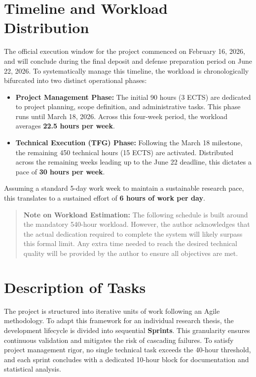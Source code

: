 \section{Timeline and Workload Distribution}
\label{sec:timeline-and-workload}

The official execution window for the project commenced on February 16, 2026, and will conclude during the final deposit and defense preparation period on June 22, 2026. To systematically manage this timeline, the workload is chronologically bifurcated into two distinct operational phases:

\begin{itemize}
    \item \textbf{Project Management Phase:} The initial 90 hours (3 ECTS) are dedicated to project planning, scope definition, and administrative tasks. This phase runs until March 18, 2026. Across this four-week period, the workload averages \textbf{22.5 hours per week}.
    \item \textbf{Technical Execution (TFG) Phase:} Following the March 18 milestone, the remaining 450 technical hours (15 ECTS) are activated. Distributed across the remaining weeks leading up to the June 22 deadline, this dictates a pace of \textbf{30 hours per week}.
\end{itemize}

Assuming a standard 5-day work week to maintain a sustainable research pace, this translates to a sustained effort of \textbf{6 hours of work per day}.

\begin{quote}
    \textbf{Note on Workload Estimation:} The following schedule is built around the mandatory 540-hour workload. However, the author acknowledges that the actual dedication required to complete the system will likely surpass this formal limit. Any extra time needed to reach the desired technical quality will be provided by the author to ensure all objectives are met.
\end{quote}

\section{Description of Tasks}
\label{sec:description-of-tasks}

The project is structured into iterative units of work following an Agile methodology. To adapt this framework for an individual research thesis, the development lifecycle is divided into sequential \textbf{Sprints}. This granularity ensures continuous validation and mitigates the risk of cascading failures. To satisfy project management rigor, no single technical task exceeds the 40-hour threshold, and each sprint concludes with a dedicated 10-hour block for documentation and statistical analysis.



